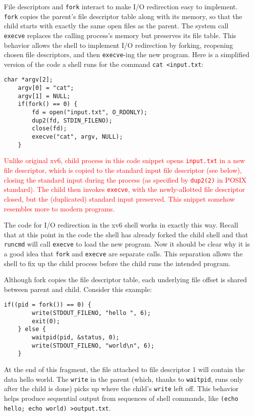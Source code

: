\documentclass{report}
\begin{document}
	File descriptors and \texttt{fork} interact to make I/O redirection easy to implement.
	\texttt{fork} copies the parent's file descriptor table along with its memory, so that the child
	starts with exactly the same open files as the parent. The system call \texttt{execve} replaces the
	calling process's memory but preserves its file table. This behavior allows the shell to
	implement I/O redirection by forking, reopening chosen file descriptors, and then \texttt{execve}-ing the 
	new program. Here is a simplified version of the code a shell runs for the
	command \texttt{cat <input.txt}:
	
	\begin{lstlisting}[style=c]
	char *argv[2];
	argv[0] = "cat";
	argv[1] = NULL;
	if(fork() == 0) {
		fd = open("input.txt", O_RDONLY);
		dup2(fd, STDIN_FILENO);
		close(fd);
		execve("cat", argv, NULL);
	}
	\end{lstlisting}
	
	\textcolor{red}{
		Unlike original xv6, child process in this code snippet opens \texttt{input.txt} in a new file
		descriptor, which is copied to the standard input file descriptor (see below), closing the standard input
		during the process (as specified by \texttt{dup2(2)} in POSIX standard).  The child then invokes
		\texttt{execve}, with the newly-allotted file descriptor closed, but the (duplicated) standard 
		input preserved.  This snippet somehow resembles more to modern programs.
	}
	
	The code for I/O redirection in the xv6 shell works in exactly this way. Recall 
	that at this point in the code the shell has already forked the child shell and that
	\texttt{runcmd} will call \texttt{execve} to load the new program. Now it should be clear why it is a
	good idea that \texttt{fork} and \texttt{execve} are separate calls. This separation allows the shell
	to fix up the child process before the child runs the intended program.
	
	Although fork copies the file descriptor table, each underlying file offset is shared
	between parent and child. Consider this example:
	
	\begin{lstlisting}[style=c]
	if((pid = fork()) == 0) {
		write(STDOUT_FILENO, "hello ", 6);
		exit(0);
	} else {
		waitpid(pid, &status, 0);
		write(STDOUT_FILENO, "world\n", 6);
	}
	\end{lstlisting}
	
	At the end of this fragment, the file attached to file descriptor 1 will contain the data
	hello world. The \texttt{write} in the parent (which, thanks to \texttt{waitpid}, runs only after the
	child is done) picks up where the child's \texttt{write} left off. This behavior helps produce
	sequential output from sequences of shell commands, like \texttt{(echo hello; echo world)
	>output.txt}.
	
\end{document}
